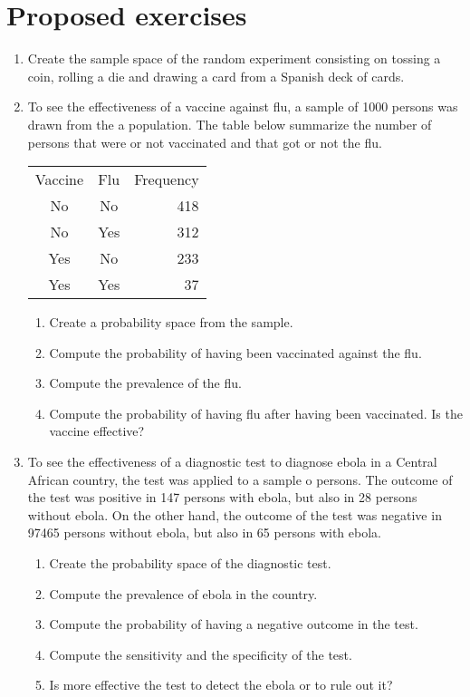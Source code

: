\section{Proposed exercises}
\begin{enumerate}[leftmargin=*]
\item Create the sample space of the random experiment consisting on tossing a coin, rolling a die and drawing a card from a Spanish deck of cards. 

\item To see the effectiveness of a vaccine against flu, a sample of 1000 persons was drawn from the a population. 
The table below summarize the number of persons that were or not vaccinated and that got or not the flu. 
\begin{center}
\begin{tabular}{ccr}
\toprule
Vaccine & Flu & Frequency\\
No & No & 418\\
No & Yes & 312\\
Yes & No & 233\\
Yes & Yes & 37\\
\bottomrule
\end{tabular}
\end{center}

\begin{enumerate}
\item Create a probability space from the sample.
\item Compute the probability of having been vaccinated against the flu.  
\item Compute the prevalence of the flu. 
\item Compute the probability of having flu after having been vaccinated.
Is the vaccine effective?
\end{enumerate}

\item To see the effectiveness of a diagnostic test to diagnose ebola in a Central African country, the test was applied to a sample o persons. 
The outcome of the test was positive in 147 persons with ebola, but also in 28 persons without ebola. 
On the other hand, the outcome of the test was negative in 97465 persons without ebola, but also in 65 persons with ebola.

\begin{enumerate}
\item Create the probability space of the diagnostic test.
\item Compute the prevalence of ebola in the country. 
\item Compute the probability of having a negative outcome in the test. 
\item Compute the sensitivity and the specificity of the test. 
\item Is more effective the test to detect the ebola or to rule out it?
\end{enumerate} 
\end{enumerate}







